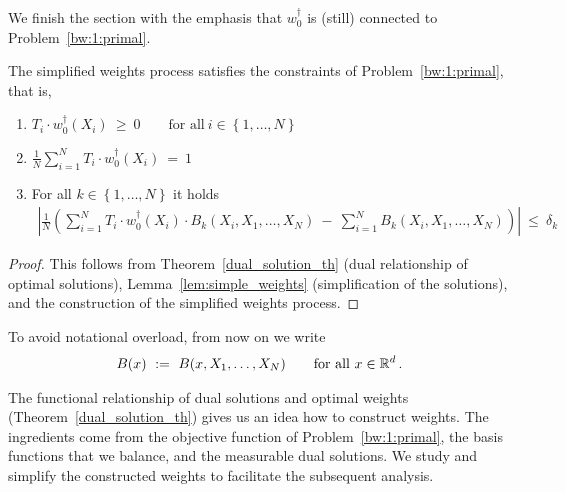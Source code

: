 We finish the section with the emphasis that $w^\dagger_0$ is (still) connected to Problem~\ref{bw:1:primal}.
\begin{theorem}
  \label{th:weights_constr}
  The simplified weights process satisfies the constraints
  of Problem~\ref{bw:1:primal}, that is,
  \begin{enumerate}[label=(\roman*)]
    \item
      $
      T_i\cdot w_0^\dagger(X_i)
      \ 
      \ge
      \ 
      0
      \qquad
      \text{for all}\ 
      i\in  \left\{ 1,\ldots,N \right\}
      $
    \item
      $
      \frac{1}{N}
      \sum_{i=1}^{N} 
      T_i\cdot w_0^\dagger(X_i)
      \ 
      =
      \ 
      1
      $
    \item
      For all $k\in \left\{ 1,\ldots,N \right\}$
      it holds
      \begin{align*}
      \left| 
      \frac{1}{N}
      \left( 
        \sum_{i=1}^{N} 
      T_i\cdot w_0^\dagger(X_i)
      \cdot
        B_k(X_i,X_1,\ldots,X_N)
        \
        -
        \
        \sum_{i=1}^{N} 
        B_k(X_i,X_1,\ldots,X_N)
      \right)
      \right|
      \ 
      \le
      \ 
      \delta_k
      \end{align*}
  \end{enumerate}
\end{theorem}
\begin{proof}
  This follows from Theorem~\ref{dual_solution_th}
  (dual relationship of optimal solutions),
  Lemma~\ref{lem:simple_weights} (simplification of the solutions),
  and the construction of the simplified weights process.
\end{proof}
To avoid notational overload, from now on we write
\begin{align*}
  B(x)
  \ 
  :=
  \ 
  B(x,X_1,\ldots,X_N)
  \qquad
  \text{for all}\ 
  x\in\R^d
  \,.
\end{align*}
\begin{takeaways}
  The functional relationship of dual solutions and optimal weights (Theorem~\ref{dual_solution_th}) gives us an idea how to construct weights.
  The ingredients come from the objective function of Problem~\ref{bw:1:primal},
  the basis functions that we balance, and the measurable dual solutions.
  We study and simplify the constructed weights to facilitate the subsequent analysis.
\end{takeaways}
